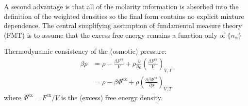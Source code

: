 A second advantage is that all of the molarity information is absorbed into the definition of the weighted densities so the final form contains no explicit mixture dependence.
The central simplifying assumption of fundamental measure theory (FMT) is to assume that the excess free energy remains a function only of $\{n_\alpha\}$

Thermodynamic consistency of the (osmotic) pressure:
\begin{equation}
  \begin{split}
    \beta p
    &=
    \rho - \frac{\beta F^\mathrm{ex}}{V}
    + \rho \frac{\partial}{\partial \rho}
    \left( \frac{\beta F^\mathrm{ex}}{V} \right)_{V,T}
    \\ &=
    \rho - \beta \Phi^\mathrm{ex}
    + \rho \left( \frac{\partial \beta \Phi^\mathrm{ex}}{\partial \rho} \right)_{V,T}
  \end{split}
\end{equation}
where $\Phi^\mathrm{ex} = F^\mathrm{ex}/V$ is the (excess) free energy density.


